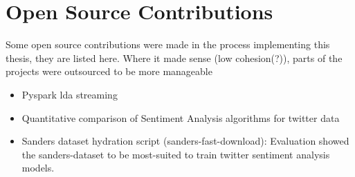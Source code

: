 \chapter{Open Source Contributions}
\label{ch:openSourceContributions}

Some open source contributions were made in the process implementing this thesis, they are listed here.
Where it made sense (low cohesion(?)), parts of the projects were outsourced to be more manageable
\begin{itemize}
    \item
    Pyspark lda streaming
    \item
    Quantitative comparison of Sentiment Analysis algorithms for twitter data
    \item
    Sanders dataset hydration script (sanders-fast-download): Evaluation showed the sanders-dataset to be most-suited to train twitter sentiment analysis models.
\end{itemize}